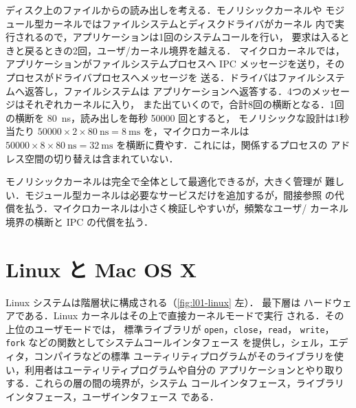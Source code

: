 \documentclass[../main.tex]{subfiles}
\begin{document}
\begin{example}
  ディスク上のファイルからの読み出しを考える．モノリシックカーネルや
  モジュール型カーネルではファイルシステムとディスクドライバがカーネル
  内で実行されるので，アプリケーションは1回のシステムコールを行い，
  要求は入るときと戻るときの2回，ユーザ/カーネル境界を越える．
  マイクロカーネルでは，アプリケーションがファイルシステムプロセスへ
  IPC メッセージを送り，そのプロセスがドライバプロセスへメッセージを
  送る．ドライバはファイルシステムへ返答し，ファイルシステムは
  アプリケーションへ返答する．4つのメッセージはそれぞれカーネルに入り，
  また出ていくので，合計8回の横断となる．1回の横断を
  \SI{80}{\nano\second}，読み出しを毎秒 \num{50000} 回とすると，
  モノリシックな設計は1秒当たり
  $\num{50000}\times 2\times\SI{80}{\nano\second} =
  \SI{8}{\milli\second}$ を，マイクロカーネルは
  $\num{50000}\times 8\times\SI{80}{\nano\second} =
  \SI{32}{\milli\second}$ を横断に費やす．これには，関係するプロセスの
  アドレス空間の切り替えは含まれていない．
\end{example}

\begin{keypoint}
  モノリシックカーネルは完全で全体として最適化できるが，大きく管理が
  難しい．モジュール型カーネルは必要なサービスだけを追加するが，間接参照
  の代償を払う．マイクロカーネルは小さく検証しやすいが，頻繁なユーザ/
  カーネル境界の横断と IPC の代償を払う．
\end{keypoint}

\section{Linux と Mac OS X}
\label{sec:l01-linux-macos}

Linux システムは階層状に構成される（\cref{fig:l01-linux} 左）．
最下層は
ハードウェアである．Linux カーネルはその上で直接カーネルモードで実行
される．その上位のユーザモードでは，
標準ライブラリが \texttt{open}，\texttt{close}，\texttt{read}，
\texttt{write}，\texttt{fork} などの関数としてシステムコールインタフェース
を提供し，シェル，エディタ，コンパイラなどの標準
ユーティリティプログラムがそのライブラリを使い，利用者はユーティリティプログラムや自分の
アプリケーションとやり取りする．これらの層の間の境界が，システム
コールインタフェース，ライブラリインタフェース，ユーザインタフェース
である．
\end{document}
